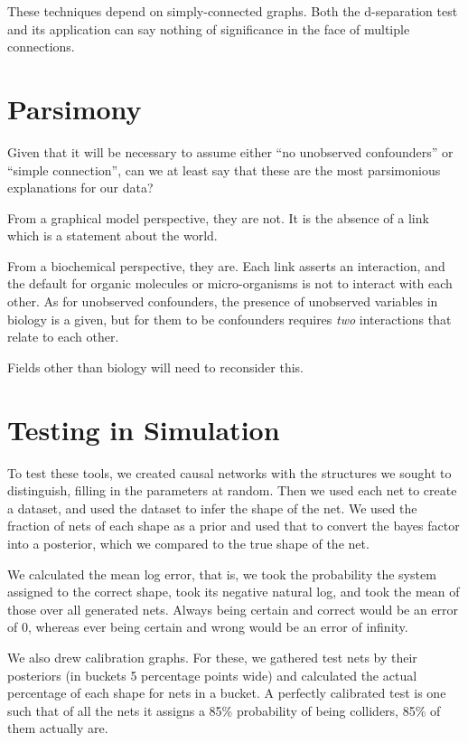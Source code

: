 \documentclass[letterpaper]{article}
\begin{document}
These techniques depend on simply-connected graphs.  Both the d-separation
test and its application can say nothing of significance in the face
of multiple connections.

\section{Parsimony}

Given that it will be necessary to assume either ``no unobserved
confounders'' or ``simple connection'', can we at least say that these
are the most parsimonious explanations for our data?

From a graphical model perspective, they are not.  It is the absence
of a link which is a statement about the world.

From a biochemical perspective, they are.  Each link asserts an
interaction, and the default for organic molecules or micro-organisms
is not to interact with each other.  As for unobserved confounders, the
presence of unobserved variables in biology is a given, but for them
to be confounders requires \textit{two} interactions that relate to
each other.

Fields other than biology will need to reconsider this.

\section{Testing in Simulation}

To test these tools, we created causal networks with the structures we
sought to distinguish, filling in the parameters at random.  Then we
used each net to create a dataset, and used the dataset to infer the
shape of the net.  We used the fraction of nets of each shape as a
prior and used that to convert the bayes factor into a posterior,
which we compared to the true shape of the net.

We calculated the mean log error, that is, we took the probability the
system assigned to the correct shape, took its negative natural log,
and took the mean of those over all generated nets.  Always being
certain and correct would be an error of 0, whereas ever being certain
and wrong would be an error of infinity.

We also drew calibration graphs.  For these, we gathered test nets by
their posteriors (in buckets 5 percentage points wide) and calculated
the actual percentage of each shape for nets in a bucket.  A perfectly
calibrated test is one such that of all the nets it assigns a 85\%
probability of being colliders, 85\% of them actually are.
\end{document}
